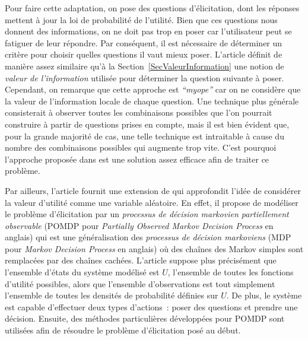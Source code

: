 \documentclass[a4paper,11pt]{article}
\theoremstyle{plain}
\begin{document}
Pour faire cette adaptation, on pose des questions d'élicitation, dont les réponses mettent à jour la loi de probabilité de l'utilité. Bien que ces questions nous donnent des informations, on ne doit pas trop en poser car l'utilisateur peut se fatiguer de leur répondre. Par conséquent, il est nécessaire de déterminer un critère pour choisir quelles questions il vaut mieux poser. L'article \cite{chajewska_making_2000} définit de manière assez similaire qu'à la Section~\ref{SecValeurInformation} une notion de \emph{valeur de l'information} utilisée pour déterminer la question suivante à poser. Cependant, on remarque que cette approche est \emph{``myope''} car on ne considère que la valeur de l'information locale de chaque question. Une technique plus générale consisterait à observer toutes les combinaisons possibles que l'on pourrait construire à partir de questions prises en compte, mais il est bien évident que, pour la grande majorité de cas, une telle technique est intraitable à cause du nombre des combinaisons possibles qui augmente trop vite. C'est pourquoi l'approche proposée dans \cite{chajewska_making_2000} est une solution assez efficace afin de traiter ce problème.

Par ailleurs, l'article \cite{boutilier_pomdp_2002} fournit une extension de \cite{chajewska_making_2000} qui approfondit l'idée de considérer la valeur d'utilité comme une variable aléatoire. En effet, il propose de modéliser le problème d'élicitation par un \emph{processus de décision markovien partiellement observable} (POMDP pour \emph{Partially Observed Markov Decision Process} en anglais) qui est une généralisation des \emph{processus de décision markoviens} (MDP pour \emph{Markov Decision Process} en anglais) où des chaînes des Markov simples sont remplacées par des chaînes cachées. L'article \cite{boutilier_pomdp_2002} suppose plus précisément que l'ensemble d'états du système modélisé est $U$, l'ensemble de toutes les fonctions d'utilité possibles, alors que l'ensemble d'observations est tout simplement l'ensemble de toutes les densités de probabilité définies sur $U$. De plus, le système est capable d'effectuer deux types d'actions~: poser des questions et prendre une décision. Ensuite, des méthodes particulières développées pour POMDP sont utilisées afin de résoudre le problème d'élicitation posé au début. %
\end{document}
